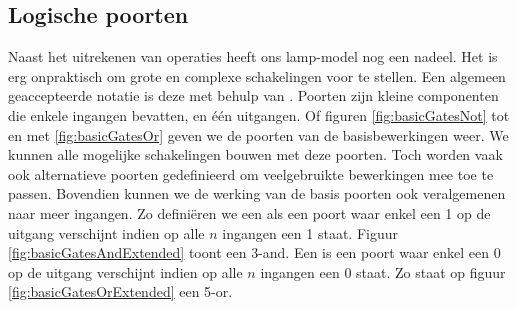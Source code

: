 \subsection{Logische poorten}
\label{ss:logischePoorten}
Naast het uitrekenen van operaties heeft ons lamp-model nog een nadeel. Het is erg onpraktisch om grote en complexe schakelingen voor te stellen. Een algemeen geaccepteerde notatie is deze met behulp van . Poorten zijn kleine componenten die enkele ingangen bevatten, en \'e\'en uitgangen. Of figuren \ref{fig:basicGatesNot} tot en met \ref{fig:basicGatesOr} geven we de poorten van de basisbewerkingen weer. We kunnen alle mogelijke schakelingen bouwen met deze poorten. Toch worden vaak ook alternatieve poorten gedefinieerd om veelgebruikte bewerkingen mee toe te passen. Bovendien kunnen we de werking van de basis poorten ook veralgemenen naar meer ingangen. Zo defini\"eren we een  als een poort waar enkel een 1 op de uitgang verschijnt indien op alle $n$ ingangen een 1 staat. Figuur \ref{fig:basicGatesAndExtended} toont een 3-and. Een  is een poort waar enkel een 0 op de uitgang verschijnt indien op alle $n$ ingangen een 0 staat. Zo staat op figuur \ref{fig:basicGatesOrExtended} een 5-or.
